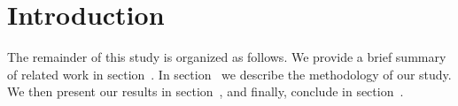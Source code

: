 \section{Introduction}

The remainder of this study is organized as follows. We provide a brief summary
of related work in section~. In
section~ we describe the methodology of our study. We
then present our results in section~, and finally,
conclude in section~.
